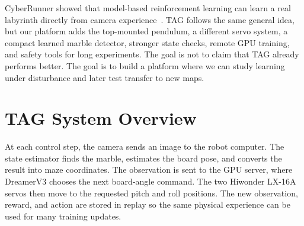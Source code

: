 \documentclass[9pt]{extarticle}
\begin{document}
CyberRunner showed that model-based reinforcement learning can learn a real labyrinth directly from camera experience~\cite{bi2023cyberrunner,cyberrepo2026}. TAG follows the same general idea, but our platform adds the top-mounted pendulum, a different servo system, a compact learned marble detector, stronger state checks, remote GPU training, and safety tools for long experiments. The goal is not to claim that TAG already performs better. The goal is to build a platform where we can study learning under disturbance and later test transfer to new maps.

\section{TAG System Overview}
At each control step, the camera sends an image to the robot computer. The state estimator finds the marble, estimates the board pose, and converts the result into maze coordinates. The observation is sent to the GPU server, where DreamerV3 chooses the next board-angle command. The two Hiwonder LX-16A servos then move to the requested pitch and roll positions. The new observation, reward, and action are stored in replay so the same physical experience can be used for many training updates.
\end{document}
